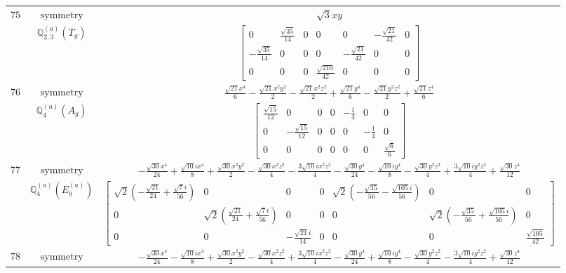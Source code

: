 \documentclass[fleqn,8pt,landscape]{jsarticle}
\begin{document}
\begin{longtable}{ccc}
$ 75 $ & $ \text{symmetry} $ & $ \sqrt{3} x y $ \\
$  $ & $ \mathbb{Q}_{2,3}^{(a)}(T_{g}) $ & $ \begin{bmatrix} 0 & \frac{\sqrt{35}}{14} & 0 & 0 & 0 & - \frac{\sqrt{21}}{42} & 0 \\ - \frac{\sqrt{35}}{14} & 0 & 0 & 0 & - \frac{\sqrt{21}}{42} & 0 & 0 \\ 0 & 0 & 0 & \frac{\sqrt{210}}{42} & 0 & 0 & 0 \end{bmatrix} $ \\ \hline
$ 76 $ & $ \text{symmetry} $ & $ \frac{\sqrt{21} x^{4}}{6} - \frac{\sqrt{21} x^{2} y^{2}}{2} - \frac{\sqrt{21} x^{2} z^{2}}{2} + \frac{\sqrt{21} y^{4}}{6} - \frac{\sqrt{21} y^{2} z^{2}}{2} + \frac{\sqrt{21} z^{4}}{6} $ \\
$  $ & $ \mathbb{Q}_{4}^{(a)}(A_{g}) $ & $ \begin{bmatrix} \frac{\sqrt{15}}{12} & 0 & 0 & 0 & - \frac{1}{4} & 0 & 0 \\ 0 & - \frac{\sqrt{15}}{12} & 0 & 0 & 0 & - \frac{1}{4} & 0 \\ 0 & 0 & 0 & 0 & 0 & 0 & \frac{\sqrt{6}}{6} \end{bmatrix} $ \\ \hline
$ 77 $ & $ \text{symmetry} $ & $ - \frac{\sqrt{30} x^{4}}{24} + \frac{\sqrt{10} i x^{4}}{8} + \frac{\sqrt{30} x^{2} y^{2}}{2} - \frac{\sqrt{30} x^{2} z^{2}}{4} - \frac{3 \sqrt{10} i x^{2} z^{2}}{4} - \frac{\sqrt{30} y^{4}}{24} - \frac{\sqrt{10} i y^{4}}{8} - \frac{\sqrt{30} y^{2} z^{2}}{4} + \frac{3 \sqrt{10} i y^{2} z^{2}}{4} + \frac{\sqrt{30} z^{4}}{12} $ \\
$  $ & $ \mathbb{Q}_{4}^{(a)}(E_{g}^{(a)}) $ & $ \begin{bmatrix} \sqrt{2} \left(- \frac{\sqrt{21}}{24} + \frac{\sqrt{7} i}{56}\right) & 0 & 0 & 0 & \sqrt{2} \left(- \frac{\sqrt{35}}{56} - \frac{\sqrt{105} i}{56}\right) & 0 & 0 \\ 0 & \sqrt{2} \left(\frac{\sqrt{21}}{24} + \frac{\sqrt{7} i}{56}\right) & 0 & 0 & 0 & \sqrt{2} \left(- \frac{\sqrt{35}}{56} + \frac{\sqrt{105} i}{56}\right) & 0 \\ 0 & 0 & - \frac{\sqrt{21} i}{14} & 0 & 0 & 0 & \frac{\sqrt{105}}{42} \end{bmatrix} $ \\ \hline
$ 78 $ & $ \text{symmetry} $ & $ - \frac{\sqrt{30} x^{4}}{24} - \frac{\sqrt{10} i x^{4}}{8} + \frac{\sqrt{30} x^{2} y^{2}}{2} - \frac{\sqrt{30} x^{2} z^{2}}{4} + \frac{3 \sqrt{10} i x^{2} z^{2}}{4} - \frac{\sqrt{30} y^{4}}{24} + \frac{\sqrt{10} i y^{4}}{8} - \frac{\sqrt{30} y^{2} z^{2}}{4} - \frac{3 \sqrt{10} i y^{2} z^{2}}{4} + \frac{\sqrt{30} z^{4}}{12} $ \\

\end{longtable}
\end{document}
